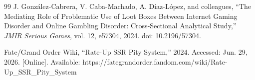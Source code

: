 \documentclass[sigconf,nonacm]{acmart}
\begin{document}
\begin{thebibliography}{99}
J. Gonz\'{a}lez-Cabrera, V. Caba-Machado, A. D\'{i}az-L\'{o}pez, and colleagues, ``The Mediating Role of Problematic Use of Loot Boxes Between Internet Gaming Disorder and Online Gambling Disorder: Cross-Sectional Analytical Study,'' \textit{JMIR Serious Games}, vol. 12, e57304, 2024. doi: 10.2196/57304.

Fate/Grand Order Wiki, ``Rate-Up SSR Pity System,'' 2024. Accessed: Jun. 29, 2026. [Online]. Available: https://fategrandorder.fandom.com/wiki/Rate-Up_SSR_Pity_System

\end{thebibliography}
\end{document}
